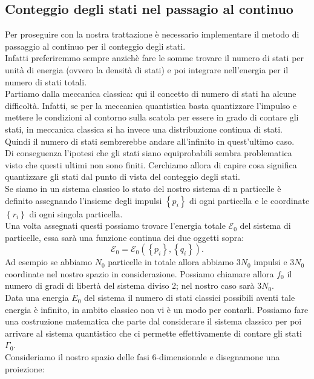 \subsection{Conteggio degli stati nel passagio al continuo}%
Per proseguire con la nostra trattazione è necessario implementare il metodo di passaggio al continuo per il conteggio degli stati. \\
Infatti preferiremmo sempre anzichè fare le somme trovare il numero di stati per unità di energia (ovvero la densità di stati) e poi integrare nell'energia per il numero di stati totali.\\
Partiamo dalla meccanica classica: qui il concetto di numero di stati ha alcune difficoltà. Infatti, se per la meccanica quantistica basta quantizzare l'impulso e mettere le condizioni al contorno sulla scatola per essere in grado di contare gli stati, in meccanica classica si ha invece una distribuzione continua di stati. Quindi il numero di stati sembrerebbe andare all'infinito in quest'ultimo caso.\\ 
Di conseguenza l'ipotesi che gli stati siano equiprobabili sembra problematica visto che questi ultimi non sono finiti. Cerchiamo allora di capire cosa significa quantizzare gli stati dal punto di vista del conteggio degli stati. \\
Se siamo in un sistema classico lo stato del nostro sistema di n particelle è definito assegnando l'insieme degli impulsi $\left\{ p_{i} \right\}$ di ogni particella e le coordinate $\left\{ r_{i} \right\}$ di ogni singola particella.\\
Una volta assegnati questi possiamo trovare l'energia totale $\mathcal{E}_{0}$ del sistema di particelle, essa sarà una funzione continua dei due oggetti sopra:
\[
	\mathcal{E}_{0} = \mathcal{E}_{0}\left( \left\{ p_{i} \right\} , \left\{ q_{i} \right\}  \right) 
.\] 
Ad esempio se abbiamo $N_0$ particelle in totale allora abbiamo $3N_0$ impulsi e $3N_0$ coordinate nel nostro spazio in considerazione. Possiamo chiamare allora $f_0$ il numero di gradi di libertà del sistema diviso 2; nel nostro caso sarà $3N_0$.\\
Data una energia $E_0$ del sistema il numero di stati classici possibili aventi tale energia è infinito, in ambito classico non vi è un modo per contarli. Possiamo fare una costruzione matematica che parte dal considerare il sistema classico per poi arrivare al sistema quantistico che ci permette effettivamente di contare gli stati $\Gamma_0$.\\
Consideriamo il nostro spazio delle fasi 6-dimensionale e disegnamone una proiezione:
